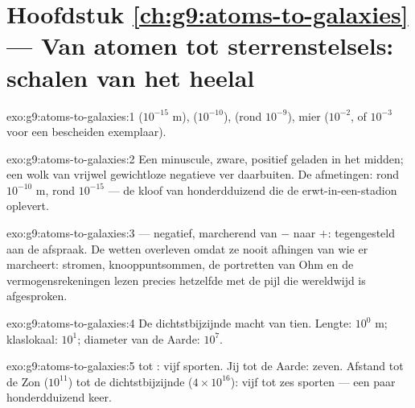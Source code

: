 \section*{Hoofdstuk \ref{ch:g9:atoms-to-galaxies} --- Van atomen tot sterrenstelsels: schalen van het heelal}

\begin{solution}{exo:g9:atoms-to-galaxies:1}
 ($10^{-15}$ \unit{m}),  ($10^{-10}$),
 (rond $10^{-9}$), mier ($10^{-2}$, of $10^{-3}$ voor
een bescheiden exemplaar).
\end{solution}

\begin{solution}{exo:g9:atoms-to-galaxies:2}
Een minuscule, zware, positief geladen  in het midden; een
wolk van vrijwel gewichtloze negatieve  ver
daarbuiten. De afmetingen:  rond $10^{-10}$ \unit{m},
 rond $10^{-15}$ --- de kloof van honderdduizend die de
erwt-in-een-stadion oplevert.
\end{solution}

\begin{solution}{exo:g9:atoms-to-galaxies:3}
 --- negatief, marcherend van $-$ naar $+$:
tegengesteld aan de afspraak. De wetten overleven omdat ze nooit
afhingen van wie er marcheert: stromen,
knooppuntsommen, de portretten van Ohm en de
vermogensrekeningen lezen precies hetzelfde met de pijl die
wereldwijd is afgesproken.
\end{solution}

\begin{solution}{exo:g9:atoms-to-galaxies:4}
De dichtstbijzijnde macht van tien. Lengte: $10^{0}$ \unit{m};
klaslokaal: $10^{1}$; diameter van de Aarde: $10^{7}$.
\end{solution}

\begin{solution}{exo:g9:atoms-to-galaxies:5}
 tot : vijf sporten. Jij tot de Aarde:
zeven. Afstand tot de Zon ($10^{11}$) tot de dichtstbijzijnde
 ($4 \times 10^{16}$): vijf tot zes sporten --- een paar
honderdduizend keer.
\end{solution}

